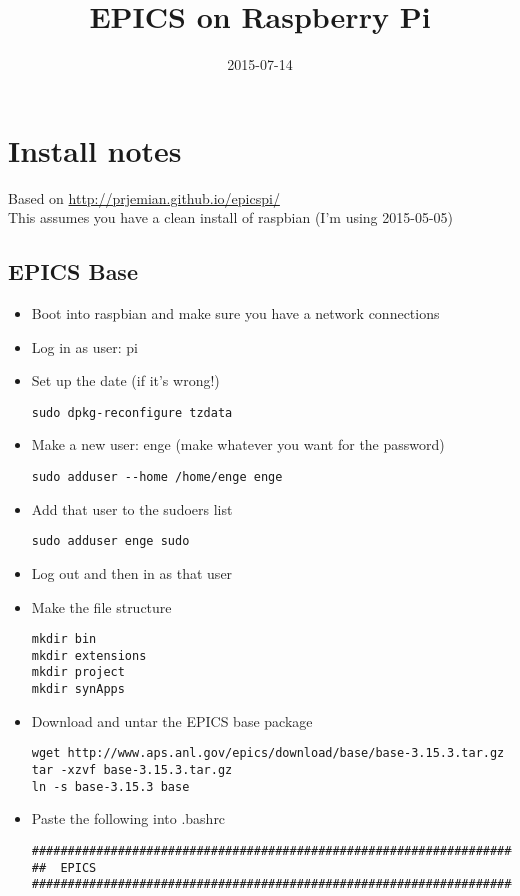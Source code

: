 \documentclass[11pt]{article}
\date{2015-07-14}
\title{EPICS on Raspberry Pi}
\begin{document}
\maketitle

\section{Install notes}
\label{sec-1}
Based on \url{http://prjemian.github.io/epicspi/}\\
  This assumes you have a clean install of raspbian (I'm using 2015-05-05)

\subsection{EPICS Base}
\label{sec-1-1}
\begin{itemize}
\item Boot into raspbian and make sure you have a network connections
\item Log in as user: pi
\item Set up the date (if it's wrong!)
\begin{verbatim}
sudo dpkg-reconfigure tzdata
\end{verbatim}
\item Make a new user: enge (make whatever you want for the password)
\begin{verbatim}
sudo adduser --home /home/enge enge
\end{verbatim}
\item Add that user to the sudoers list
\begin{verbatim}
sudo adduser enge sudo
\end{verbatim}
\item Log out and then in as that user
\item Make the file structure
\begin{verbatim}
mkdir bin
mkdir extensions
mkdir project
mkdir synApps
\end{verbatim}
\item Download and untar the EPICS base package
\begin{verbatim}
wget http://www.aps.anl.gov/epics/download/base/base-3.15.3.tar.gz 
tar -xzvf base-3.15.3.tar.gz
ln -s base-3.15.3 base
\end{verbatim}
\item Paste the following into .bashrc
\begin{verbatim}
######################################################################
##  EPICS
######################################################################


\end{verbatim}
\end{itemize}
\end{document}
